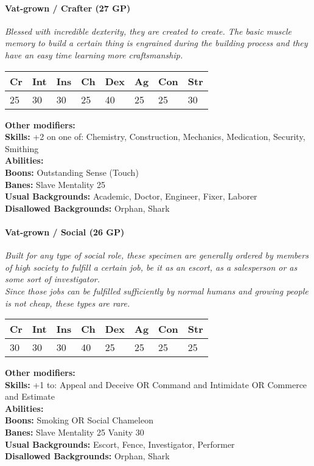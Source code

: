 \documentclass[12pt,a4paper,openany]{book}
\begin{document}
	\hrulefill
	\paragraph*{Vat-grown / Crafter (27 GP)}
	\textit{Blessed with incredible dexterity, they are created to create. The basic muscle memory to build a certain thing is engrained during the building process and they have an easy time learning more craftsmanship.}\par
	\begin{tabular}{|l|l|l|l|l|l|l|l|}
		\hline
		Cr & Int & Ins & Ch & Dex & Ag & Con & Str \\ \hline
		25 & 30 & 30 & 25 & 40 & 25 & 25 & 30 \\ \hline
	\end{tabular}\par
	\noindent\textbf{Other modifiers:} \\
	\textbf{Skills:} +2 on one of: Chemistry, Construction, Mechanics, Medication, Security, Smithing\\
	\textbf{Abilities:} \\
	\textbf{Boons:} Outstanding Sense (Touch)\\
	\textbf{Banes:} Slave Mentality 25\\
	\textbf{Usual Backgrounds:} Academic, Doctor, Engineer, Fixer, Laborer\\
	\textbf{Disallowed Backgrounds:} Orphan, Shark
	
	\hrulefill
	\paragraph*{Vat-grown / Social (26 GP)}
	\textit{Built for any type of social role, these specimen are generally ordered by members of high society to fulfill a certain job, be it as an escort, as a salesperson or as some sort of investigator.\\
	Since those jobs can be fulfilled sufficiently by normal humans and growing people is not cheap, these types are rare.}\par
	\begin{tabular}{|l|l|l|l|l|l|l|l|}
		\hline
		Cr & Int & Ins & Ch & Dex & Ag & Con & Str \\ \hline
		30 & 30 & 30 & 40 & 25 & 25 & 25 & 25 \\ \hline
	\end{tabular}\par
	\noindent\textbf{Other modifiers:} \\
	\textbf{Skills:} +1 to: Appeal and Deceive OR Command and Intimidate OR Commerce and Estimate\\
	\textbf{Abilities:} \\
	\textbf{Boons:} Smoking OR Social Chameleon\\
	\textbf{Banes:} Slave Mentality 25
	Vanity 30\\
	\textbf{Usual Backgrounds:} Escort, Fence, Investigator, Performer\\
	\textbf{Disallowed Backgrounds:} Orphan, Shark
	
\end{document}
